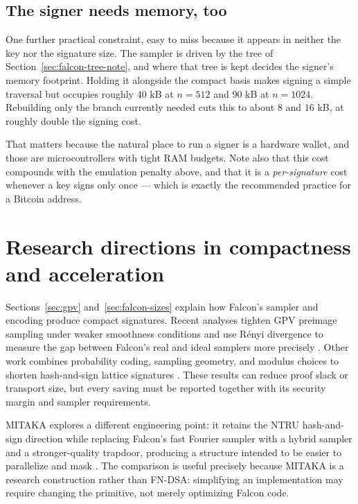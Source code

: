\subsection{The signer needs memory, too}

One further practical constraint, easy to miss because it appears in neither the
key nor the signature size. The sampler is driven by the tree of
Section~\ref{sec:falcon-tree-note}, and where that tree is kept decides the
signer's memory footprint. Holding it alongside the compact basis makes signing a
simple traversal but occupies roughly $40$ kB at $n=512$ and $90$ kB at
$n=1024$. Rebuilding only the branch currently needed cuts this to about $8$ and
$16$ kB, at roughly double the signing cost.

That matters because the natural place to run a signer is a hardware wallet, and
those are microcontrollers with tight RAM budgets. Note also that this cost
compounds with the emulation penalty above, and that it is a \emph{per-signature}
cost whenever a key signs only once --- which is exactly the recommended practice
for a Bitcoin address.

\section{Research directions in compactness and acceleration}
\label{sec:fndsa-acceleration}

Sections~\ref{sec:gpv} and~\ref{sec:falcon-sizes} explain how Falcon's sampler and
encoding produce compact signatures. Recent analyses tighten GPV preimage sampling under
weaker smoothness conditions and use R\'enyi divergence to measure the gap between
Falcon's real and ideal samplers more precisely
\cite{gpvweak2025,falconcloser2024}. Other work combines probability coding,
sampling geometry, and modulus choices to shorten hash-and-sign lattice signatures
\cite{shorterhashsign2022}. These results can reduce proof slack or transport size,
but every saving must be reported together with its security margin and sampler
requirements.

MITAKA explores a different engineering point: it retains the NTRU hash-and-sign
direction while replacing Falcon's fast Fourier sampler with a hybrid sampler and
a stronger-quality trapdoor, producing a structure intended to be easier to
parallelize and mask \cite{mitaka2022}. The comparison is useful precisely because
MITAKA is a research construction rather than FN-DSA: simplifying an implementation
may require changing the primitive, not merely optimizing Falcon code.

